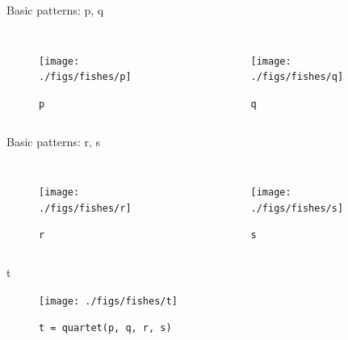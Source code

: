 \documentclass{beamer}
\begin{document}
    \begin{frame}{Basic patterns: p, q}

        \begin{columns}[T,onlytextwidth]
                \begin{figure}
                    \centering
                    \texttt{[image: ./figs/fishes/p]}
                    \caption{\texttt{p}}
                    \label{fig:p}
                \end{figure}

                \begin{figure}
                    \centering
                    \texttt{[image: ./figs/fishes/q]}
                    \caption{\texttt{q}}
                    \label{fig:q}
                \end{figure}

        \end{columns}

    \end{frame}

    \begin{frame}{Basic patterns: r, s}
        \begin{columns}[T,onlytextwidth]
                \begin{figure}
                    \centering
                    \texttt{[image: ./figs/fishes/r]}
                    \caption{\texttt{r}}
                    \label{fig:r}
                \end{figure}

                \begin{figure}
                    \centering
                    \texttt{[image: ./figs/fishes/s]}
                    \caption{\texttt{s}}
                    \label{fig:s}
                \end{figure}
        \end{columns}

    \end{frame}

    \begin{frame}{t}

        \begin{figure}
            \centering
            \texttt{[image: ./figs/fishes/t]}
            \caption{\texttt{t = quartet(p, q, r, s)}}
            \label{fig:t}
        \end{figure}

    \end{frame}
\end{document}
